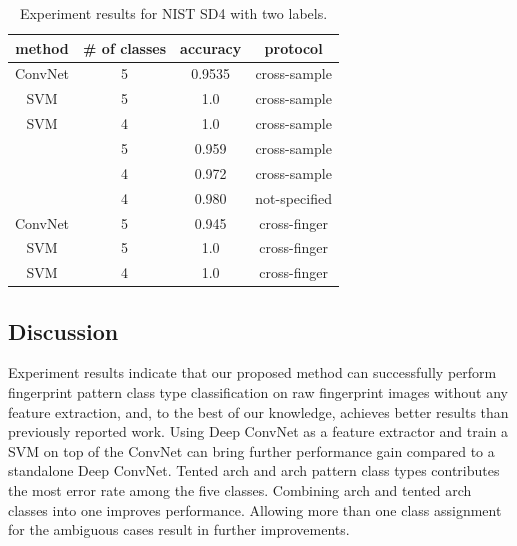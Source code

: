 \begin{table}[!ht]
	\centering
	\caption{Experiment results for NIST SD4 with two labels.}
	\label{tab.SD4_result_two_labels}
	\begin{tabular}{|c|c|c|c|}
		\hline
		\textbf{method} & \textbf{\# of classes} & \textbf{accuracy} & \textbf{protocol} \\ \hline
		ConvNet & 5 & 0.9535 & cross-sample \\ \hline
		SVM & 5 & 1.0 & cross-sample \\ \hline
		SVM & 4 & 1.0 & cross-sample \\ \hline
		\cite{cao2013fingerprint} & 5 & 0.959 & cross-sample \\ \hline
		\cite{cao2013fingerprint}& 4 & 0.972 & cross-sample \\ \hline
		\cite{wang2014fingerprint} & 4 & 0.980 & not-specified \\ \hline
		ConvNet & 5 & 0.945 & cross-finger \\ \hline
		SVM & 5 & 1.0 & cross-finger \\ \hline
		SVM & 4 & 1.0 & cross-finger \\ \hline
	\end{tabular}
\end{table}

\subsection{Discussion}
\label{sec_discussion}
%
Experiment results indicate that our proposed method can successfully perform fingerprint pattern class type classification on raw fingerprint images without any feature extraction, and, to the best of our knowledge, achieves better results than previously reported work. 
Using Deep ConvNet as a feature extractor and train a SVM on top of the ConvNet can bring further performance gain compared to a standalone Deep ConvNet.  
%
%
%
Tented arch and arch pattern class types contributes the most error rate among the five classes.  Combining arch and tented arch classes into one improves performance. Allowing more than one class assignment for the ambiguous cases result in further improvements.
%
%


